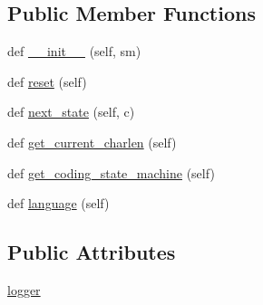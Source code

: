 \subsection*{Public Member Functions}
\begin{DoxyCompactItemize}
\item 
def \hyperlink{classpip_1_1__vendor_1_1chardet_1_1codingstatemachine_1_1CodingStateMachine_ac38ba14c34673a2370107da23bd2906d}{\+\_\+\+\_\+init\+\_\+\+\_\+} (self, sm)
\item 
def \hyperlink{classpip_1_1__vendor_1_1chardet_1_1codingstatemachine_1_1CodingStateMachine_a166581e46d6368be7bf5796ccb5a677a}{reset} (self)
\item 
def \hyperlink{classpip_1_1__vendor_1_1chardet_1_1codingstatemachine_1_1CodingStateMachine_a4e0e7db5b52c8c664cdf74a73626a242}{next\+\_\+state} (self, c)
\item 
def \hyperlink{classpip_1_1__vendor_1_1chardet_1_1codingstatemachine_1_1CodingStateMachine_a9b70697fe5c93e2fa320783e98182a07}{get\+\_\+current\+\_\+charlen} (self)
\item 
def \hyperlink{classpip_1_1__vendor_1_1chardet_1_1codingstatemachine_1_1CodingStateMachine_ae1344161f1303742c45fe5757e101ab3}{get\+\_\+coding\+\_\+state\+\_\+machine} (self)
\item 
def \hyperlink{classpip_1_1__vendor_1_1chardet_1_1codingstatemachine_1_1CodingStateMachine_a614d534b5c14959315e4b64155104567}{language} (self)
\end{DoxyCompactItemize}
\subsection*{Public Attributes}
\begin{DoxyCompactItemize}
\item 
\hyperlink{classpip_1_1__vendor_1_1chardet_1_1codingstatemachine_1_1CodingStateMachine_afacacdb15e197d8a3ab4f73b9fd76354}{logger}
\end{DoxyCompactItemize}


